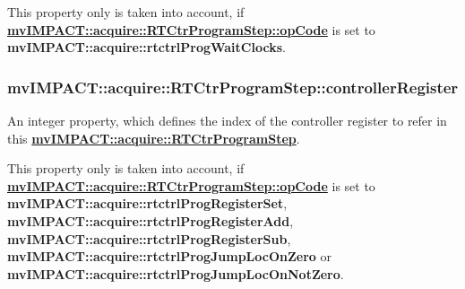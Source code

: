 This property only is taken into account, if {\bfseries \hyperlink{classmv_i_m_p_a_c_t_1_1acquire_1_1_r_t_ctr_program_step_a823c9cad26ad628155d68130ad1d6d5d}{mv\+I\+M\+P\+A\+C\+T\+::acquire\+::\+R\+T\+Ctr\+Program\+Step\+::op\+Code}} is set to {\bfseries mv\+I\+M\+P\+A\+C\+T\+::acquire\+::rtctrl\+Prog\+Wait\+Clocks}. \hypertarget{classmv_i_m_p_a_c_t_1_1acquire_1_1_r_t_ctr_program_step_af6109b0aa37200c31f2bbeecd5f2eec8}{
\subsubsection[{controller\+Register}]{ mv\+I\+M\+P\+A\+C\+T\+::acquire\+::\+R\+T\+Ctr\+Program\+Step\+::controller\+Register}}\label{classmv_i_m_p_a_c_t_1_1acquire_1_1_r_t_ctr_program_step_af6109b0aa37200c31f2bbeecd5f2eec8}


An integer property, which defines the index of the controller register to refer in this {\bfseries \hyperlink{classmv_i_m_p_a_c_t_1_1acquire_1_1_r_t_ctr_program_step}{mv\+I\+M\+P\+A\+C\+T\+::acquire\+::\+R\+T\+Ctr\+Program\+Step}}. 

This property only is taken into account, if {\bfseries \hyperlink{classmv_i_m_p_a_c_t_1_1acquire_1_1_r_t_ctr_program_step_a823c9cad26ad628155d68130ad1d6d5d}{mv\+I\+M\+P\+A\+C\+T\+::acquire\+::\+R\+T\+Ctr\+Program\+Step\+::op\+Code}} is set to {\bfseries mv\+I\+M\+P\+A\+C\+T\+::acquire\+::rtctrl\+Prog\+Register\+Set}, {\bfseries mv\+I\+M\+P\+A\+C\+T\+::acquire\+::rtctrl\+Prog\+Register\+Add}, {\bfseries mv\+I\+M\+P\+A\+C\+T\+::acquire\+::rtctrl\+Prog\+Register\+Sub}, {\bfseries mv\+I\+M\+P\+A\+C\+T\+::acquire\+::rtctrl\+Prog\+Jump\+Loc\+On\+Zero} or {\bfseries mv\+I\+M\+P\+A\+C\+T\+::acquire\+::rtctrl\+Prog\+Jump\+Loc\+On\+Not\+Zero}.

